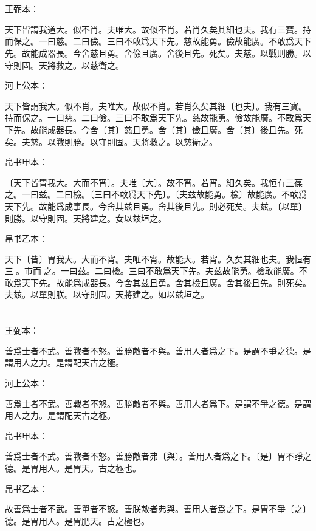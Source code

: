 \documentclass[a5paper]{ctexbook}
\begin{document}
    \chapter{}
    王弼本：

    天下皆謂我道大。似不肖。夫唯大。故似不肖。若肖久矣其細也夫。我有三寶。持而保之。一曰慈。二曰儉。三曰不敢爲天下先。慈故能勇。儉故能廣。不敢爲天下先。故能成器長。今舍慈且勇。舍儉且廣。舍後且先。死矣。夫慈。以戰則勝。以守則固。天將救之。以慈衛之。

    河上公本：

    天下皆謂我大。似不肖。夫唯大。故似不肖。若肖久矣其細〔也夫〕。我有三寶。持而保之。一曰慈。二曰儉。三曰不敢爲天下先。慈故能勇。儉故能廣。不敢爲天下先。故能成器長。今舍〔其〕慈且勇。舍〔其〕儉且廣。舍〔其〕後且先。死矣。夫慈。以戰則勝。以守則固。天將救之。以慈衛之。

    帛书甲本：

    〔天下皆胃我大。大而不宵〕。夫唯〔大〕。故不宵。若宵。細久矣。我恒有三葆之。一曰兹。二曰檢。〔三曰不敢爲天下先〕。〔夫兹故能勇。檢〕故能廣。不敢爲天下先。故能爲成事長。今舍其兹且勇。舍其後且先。則必死矣。夫兹。〔以單〕則勝。以守則固。天將建之。女以兹垣之。

    帛书乙本：

    天下〔皆〕胃我大。大而不宵。夫唯不宵。故能大。若宵。久矣其細也夫。我恒有三𤥯。市而𤥯之。一曰兹。二曰檢。三曰不敢爲天下先。夫兹故能勇。檢敢能廣。不敢爲天下先。故能爲成器長。今舍其兹且勇。舍其檢且廣。舍其後且先。則死矣。夫兹。以單則朕。以守則固。天將建之。如以兹垣之。

    \chapter{}
    王弼本：

    善爲士者不武。善戰者不怒。善勝敵者不與。善用人者爲之下。是謂不爭之德。是謂用人之力。是謂配天古之極。

    河上公本：

    善爲士者不武。善戰者不怒。善勝敵者不與。善用人者爲下。是謂不爭之德。是謂用人之力。是謂配天古之極。

    帛书甲本：

    善爲士者不武。善戰者不怒。善勝敵者弗〔與〕。善用人者爲之下。〔是〕胃不諍之德。是胃用人。是胃天。古之極也。

    帛书乙本：

    故善爲士者不武。善單者不怒。善朕敵者弗與。善用人者爲之下。是胃不爭〔之〕德。是胃用人。是胃肥天。古之極也。
\end{document}
